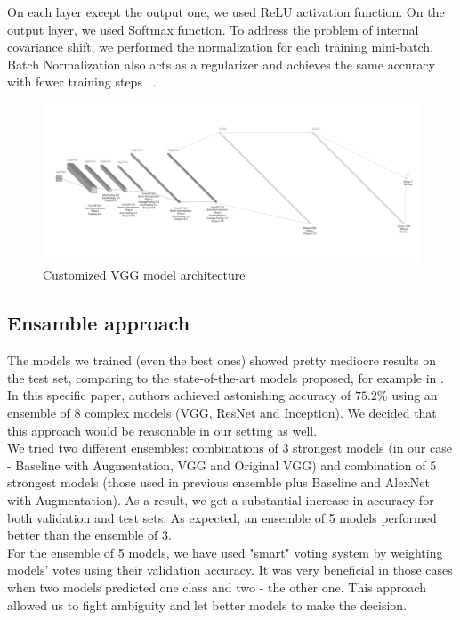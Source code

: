 On each layer except the output one, we used ReLU activation function.  On the output layer, we used Softmax function. To address the problem of internal covariance shift, we performed the normalization for each training mini-batch. Batch Normalization also acts as a regularizer and achieves the same accuracy with fewer training steps ~\cite{batchnormalization}.

\begin{figure}
	\centering
	\includegraphics[width=\textwidth]{../images/vgg-adjusted.jpg}
	\caption{Customized VGG model architecture}
	\label{fig:VGG}
\end{figure}

\subsection{Ensamble approach}

The models we trained (even the best ones) showed pretty mediocre results on the test set, comparing to the state-of-the-art models proposed, for example in \cite{ferSOTA}. In this specific paper, authors achieved astonishing accuracy of $75.2\%$ using an ensemble of 8 complex models (VGG, ResNet and Inception). We decided that this approach would be reasonable in our setting as well.\\

We tried two different ensembles: combinations of 3 strongest models (in our case - Baseline with Augmentation, VGG and Original VGG) and combination of 5 strongest models (those used in previous ensemble plus Baseline and AlexNet with Augmentation). As a result, we got a substantial increase in accuracy for both validation and test sets. As expected, an ensemble of 5 models performed better than the ensemble of 3. \\

For the ensemble of 5 models, we have used "smart" voting system by weighting models' votes using their validation accuracy. It was very beneficial in those cases when two models predicted one class and two - the other one. This approach allowed us to fight ambiguity and let better models to make the decision.\\

